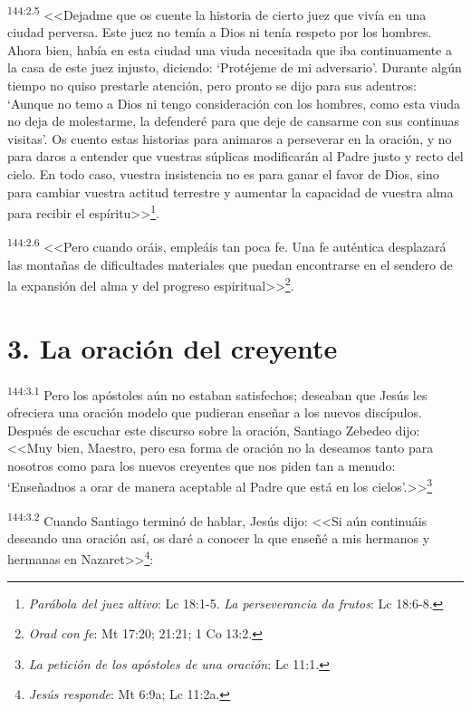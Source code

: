 \par 
\textsuperscript{144:2.5} <<Dejadme que os cuente la historia de cierto juez que vivía en una ciudad perversa. Este juez no temía a Dios ni tenía respeto por los hombres. Ahora bien, había en esta ciudad una viuda necesitada que iba continuamente a la casa de este juez injusto, diciendo: `Protéjeme de mi adversario'. Durante algún tiempo no quiso prestarle atención, pero pronto se dijo para sus adentros: `Aunque no temo a Dios ni tengo consideración con los hombres, como esta viuda no deja de molestarme, la defenderé para que deje de cansarme con sus continuas visitas'. Os cuento estas historias para animaros a perseverar en la oración, y no para daros a entender que vuestras súplicas modificarán al Padre justo y recto del cielo. En todo caso, vuestra insistencia no es para ganar el favor de Dios, sino para cambiar vuestra actitud terrestre y aumentar la capacidad de vuestra alma para recibir el espíritu>>\footnote{\textit{Parábola del juez altivo}: Lc 18:1-5. \textit{La perseverancia da frutos}: Lc 18:6-8.}.

\par 
\textsuperscript{144:2.6} <<Pero cuando oráis, empleáis tan poca fe. Una fe auténtica desplazará las montañas de dificultades materiales que puedan encontrarse en el sendero de la expansión del alma y del progreso espiritual>>\footnote{\textit{Orad con fe}: Mt 17:20; 21:21; 1 Co 13:2.}.

\section*{3. La oración del creyente}
\par 
\textsuperscript{144:3.1} Pero los apóstoles aún no estaban satisfechos; deseaban que Jesús les ofreciera una oración modelo que pudieran enseñar a los nuevos discípulos. Después de escuchar este discurso sobre la oración, Santiago Zebedeo dijo: <<Muy bien, Maestro, pero esa forma de oración no la deseamos tanto para nosotros como para los nuevos creyentes que nos piden tan a menudo: `Enseñadnos a orar de manera aceptable al Padre que está en los cielos'.>>\footnote{\textit{La petición de los apóstoles de una oración}: Lc 11:1.}

\par 
\textsuperscript{144:3.2} Cuando Santiago terminó de hablar, Jesús dijo: <<Si aún continuáis deseando una oración así, os daré a conocer la que enseñé a mis hermanos y hermanas en Nazaret>>\footnote{\textit{Jesús responde}: Mt 6:9a; Lc 11:2a.}:

